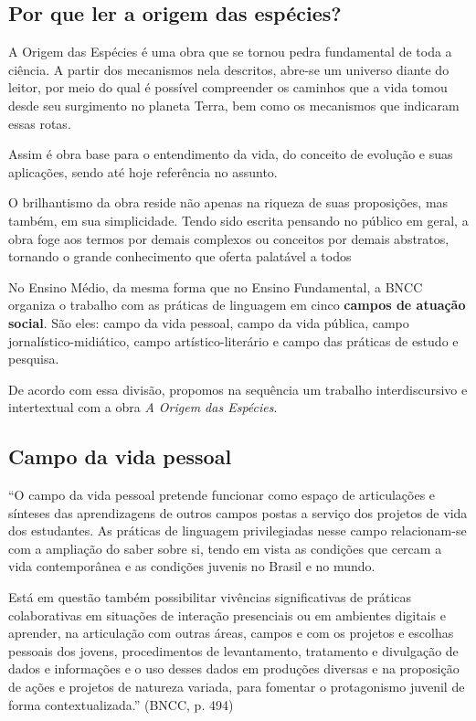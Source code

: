 \documentclass[12pt]{extarticle}
\begin{document}
\subsection{Por que ler a origem das espécies?}

A Origem das Espécies é uma obra que se tornou pedra fundamental de toda
a ciência. A partir dos mecanismos nela descritos, abre-se um universo
diante do leitor, por meio do qual é possível compreender os caminhos
que a vida tomou desde seu surgimento no planeta Terra, bem como os
mecanismos que indicaram essas rotas.

Assim é obra base para o entendimento da vida, do conceito de evolução e
suas aplicações, sendo até hoje referência no assunto.

O brilhantismo da obra reside não apenas na riqueza de suas proposições,
mas também, em sua simplicidade. Tendo sido escrita pensando no público
em geral, a obra foge aos termos por demais complexos ou conceitos por
demais abstratos, tornando o grande conhecimento que oferta palatável a
todos


No Ensino Médio, da mesma forma que no Ensino Fundamental, a BNCC
organiza o trabalho com as práticas de linguagem em cinco \textbf{campos
de atuação social}. São eles: campo da vida pessoal, campo da vida
pública, campo jornalístico-midiático, campo artístico-literário e campo
das práticas de estudo e pesquisa.

De acordo com essa divisão, propomos na sequência um trabalho
interdiscursivo e intertextual com a obra \emph{A Origem das Espécies}.

\subsection{Campo da vida pessoal}

``O campo da vida pessoal pretende funcionar como espaço de articulações
e sínteses das aprendizagens de outros campos postas a serviço dos
projetos de vida dos estudantes. As práticas de linguagem privilegiadas
nesse campo relacionam-se com a ampliação do saber sobre si, tendo em
vista as condições que cercam a vida contemporânea e as condições
juvenis no Brasil e no mundo.

Está em questão também possibilitar vivências significativas de práticas
colaborativas em situações de interação presenciais ou em ambientes
digitais e aprender, na articulação com outras áreas, campos e com os
projetos e escolhas pessoais dos jovens, procedimentos de levantamento,
tratamento e divulgação de dados e informações e o uso desses dados em
produções diversas e na proposição de ações e projetos de natureza
variada, para fomentar o protagonismo juvenil de forma
contextualizada.'' (BNCC, p. 494)
\end{document}
